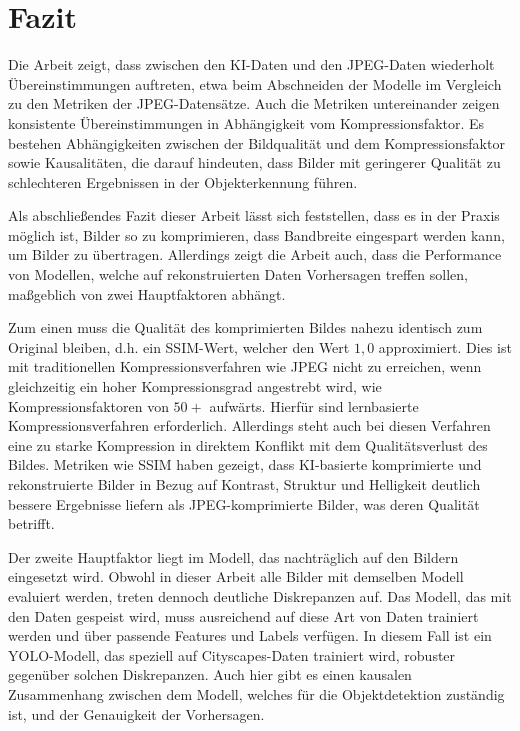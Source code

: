 \chapter{Fazit}
    Die Arbeit zeigt, dass zwischen den KI-Daten und den JPEG-Daten wiederholt Übereinstimmungen auftreten, etwa beim Abschneiden der Modelle im Vergleich zu den Metriken der JPEG-Datensätze. Auch die Metriken untereinander zeigen konsistente Übereinstimmungen in Abhängigkeit vom Kompressionsfaktor. Es bestehen Abhängigkeiten zwischen der Bildqualität und dem Kompressionsfaktor sowie Kausalitäten, die darauf hindeuten, dass Bilder mit geringerer Qualität zu schlechteren Ergebnissen in der Objekterkennung führen.
    
    Als abschließendes Fazit dieser Arbeit lässt sich feststellen, dass es in der Praxis möglich ist, Bilder so zu komprimieren, dass Bandbreite eingespart werden kann, um Bilder zu übertragen. Allerdings zeigt die Arbeit auch, dass die Performance von Modellen, welche auf rekonstruierten Daten Vorhersagen treffen sollen, maßgeblich von zwei Hauptfaktoren abhängt.
    
    Zum einen muss die Qualität des komprimierten Bildes nahezu identisch zum Original bleiben, d.h. ein SSIM-Wert, welcher den Wert $1,0$ approximiert. Dies ist mit traditionellen Kompressionsverfahren wie JPEG nicht zu erreichen, wenn gleichzeitig ein hoher Kompressionsgrad angestrebt wird, wie Kompressionsfaktoren von $50+$ aufwärts. Hierfür sind lernbasierte Kompressionsverfahren erforderlich. Allerdings steht auch bei diesen Verfahren eine zu starke Kompression in direktem Konflikt mit dem Qualitätsverlust des Bildes. 
    Metriken wie SSIM haben gezeigt, dass KI-basierte komprimierte und rekonstruierte Bilder in Bezug auf Kontrast, Struktur und Helligkeit deutlich bessere Ergebnisse liefern als JPEG-komprimierte Bilder, was deren Qualität betrifft. 

    Der zweite Hauptfaktor liegt im Modell, das nachträglich auf den Bildern eingesetzt wird. Obwohl in dieser Arbeit alle Bilder mit demselben Modell evaluiert werden, treten dennoch deutliche Diskrepanzen auf. Das Modell, das mit den Daten gespeist wird, muss ausreichend auf diese Art von Daten trainiert werden und über passende Features und Labels verfügen. In diesem Fall ist ein YOLO-Modell, das speziell auf Cityscapes-Daten trainiert wird, robuster gegenüber solchen Diskrepanzen. Auch hier gibt es einen kausalen Zusammenhang zwischen dem Modell, welches für die Objektdetektion zuständig ist, und der Genauigkeit der Vorhersagen.

